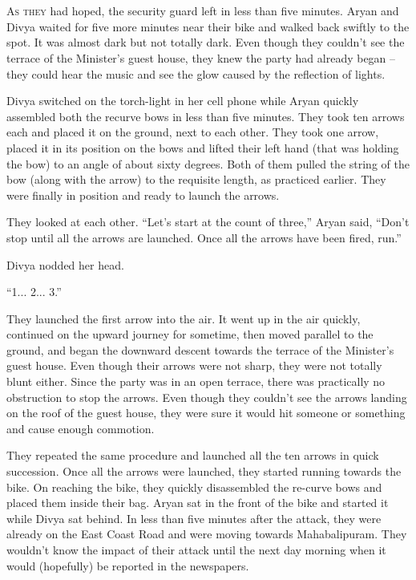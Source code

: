 \chapter{}

\lettrine{A}{s they} had hoped, the security guard left in less than five minutes. Aryan and
Divya waited for five more minutes near their bike and walked back swiftly to
the spot. It was almost dark but not totally dark. Even though they couldn't see
the terrace of the Minister's guest house, they knew the party had already began
– they could hear the music and see the glow caused by the reflection of lights.


Divya switched on the torch-light in her cell phone while Aryan quickly
assembled both the recurve bows in less than five minutes. They took ten arrows
each and placed it on the ground, next to each other. They took one arrow,
placed it in its position on the bows and lifted their left hand (that was
holding the bow) to an angle of about sixty degrees. Both of them pulled the
string of the bow (along with the arrow) to the requisite length, as practiced
earlier. They were finally in position and ready to launch the arrows.

They looked at each other. “Let's start at the count of three,” Aryan said,
“Don't stop until all the arrows are launched. Once all the arrows have been
fired, run.”

Divya nodded her head.

“1... 2... 3.”

They launched the first arrow into the air. It went up in the air quickly,
continued on the upward journey for sometime, then moved parallel to the ground,
and began the downward descent towards the terrace of the Minister's guest
house. Even though their arrows were not sharp, they were not totally blunt
either. Since the party was in an open terrace, there was practically no
obstruction to stop the arrows. Even though they couldn't see the arrows landing
on the roof of the guest house, they were sure it would hit someone or something
and cause enough commotion.

They repeated the same procedure and launched all the ten arrows in quick
succession. Once all the arrows were launched, they started running towards the
bike. On reaching the bike, they quickly disassembled the re-curve bows and
placed them inside their bag. Aryan sat in the front of the bike and started it
while Divya sat behind. In less than five minutes after the attack, they were
already on the East Coast Road and were moving towards Mahabalipuram. They
wouldn't know the impact of their attack until the next day morning when it
would (hopefully) be reported in the newspapers.

